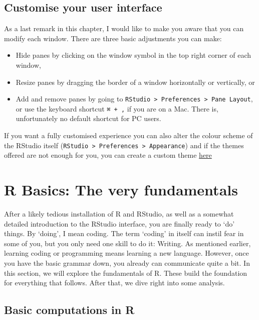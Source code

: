 \documentclass[
]{book}
\begin{document}
\hypertarget{customise-your-user-interface}{%
\section{Customise your user interface}\label{customise-your-user-interface}}

As a last remark in this chapter, I would like to make you aware that you can modify each window. There are three basic adjustments you can make:

\begin{itemize}
\item
  Hide panes by clicking on the window symbol in the top right corner of each window,
\item
  Resize panes by dragging the border of a window horizontally or vertically, or
\item
  Add and remove panes by going to \texttt{RStudio\ \textgreater{}\ Preferences\ \textgreater{}\ Pane\ Layout}, or use the keyboard shortcut \texttt{⌘\ +\ ,} if you are on a Mac. There is, unfortunately no default shortcut for PC users.
\end{itemize}

If you want a fully customised experience you can also alter the colour scheme of the RStudio itself (\texttt{RStudio\ \textgreater{}\ Preferences\ \textgreater{}\ Appearance}) and if the themes offered are not enough for you, you can create a custom theme \href{https://tmtheme-editor.herokuapp.com/\#!/editor/theme/Monokai}{here}

\hypertarget{r-basics-the-very-fundamentals}{%
\chapter{R Basics: The very fundamentals}\label{r-basics-the-very-fundamentals}}

After a likely tedious installation of R and RStudio, as well as a somewhat detailed introduction to the RStudio interface, you are finally ready to `do' things. By `doing', I mean coding. The term `coding' in itself can instil fear in some of you, but you only need one skill to do it: Writing. As mentioned earlier, learning coding or programming means learning a new language. However, once you have the basic grammar down, you already can communicate quite a bit. In this section, we will explore the fundamentals of R. These build the foundation for everything that follows. After that, we dive right into some analysis.

\hypertarget{basic-computations-in-r}{%
\section{Basic computations in R}\label{basic-computations-in-r}}
\end{document}
